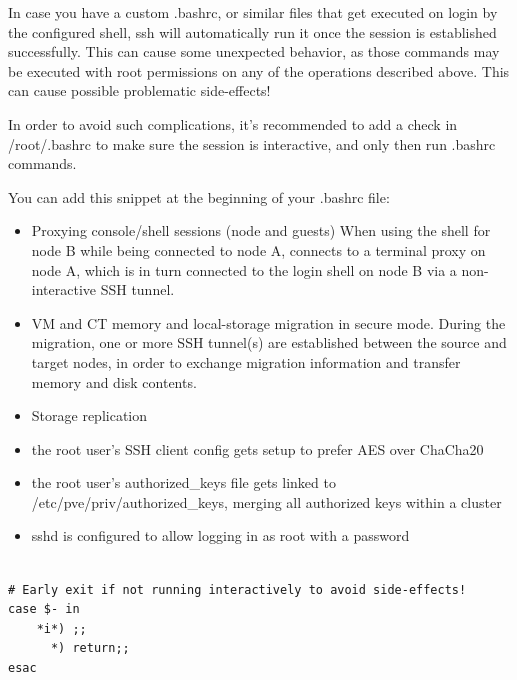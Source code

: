 In case you have a custom .bashrc, or similar files that get executed on login by the configured shell, ssh will automatically run it once the session is established successfully. This can cause some unexpected behavior, as those commands may be executed with root permissions on any of the operations described above. This can cause possible problematic side-effects!

In order to avoid such complications, it’s recommended to add a check in /root/.bashrc to make sure the session is interactive, and only then run .bashrc commands.

You can add this snippet at the beginning of your .bashrc file:

\begin{itemize}[leftmargin=2cm]

	\item Proxying console/shell sessions (node and guests) When using the shell for node B while being connected to node A, connects to a terminal proxy on node A, which is in turn connected to the login shell on node B via a non-interactive SSH tunnel.

	\item VM and CT memory and local-storage migration in secure mode. During the migration, one or more SSH tunnel(s) are established between the source and target nodes, in order to exchange migration information and transfer memory and disk contents.

	\item Storage replication

\end{itemize}

\begin{itemize}[leftmargin=2cm]

	\item the root user’s SSH client config gets setup to prefer AES over ChaCha20

	\item the root user’s authorized_keys file gets linked to /etc/pve/priv/authorized_keys, merging all authorized keys within a cluster

	\item sshd is configured to allow logging in as root with a password

\end{itemize}

\begin{lstlisting}

# Early exit if not running interactively to avoid side-effects!
case $- in
    *i*) ;;
      *) return;;
esac

\end{lstlisting}


